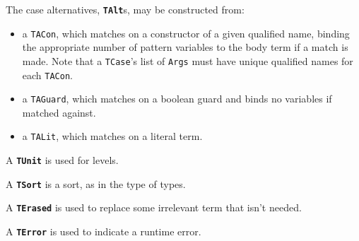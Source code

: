 The case alternatives, \textbf{\lstinline{TAlt}}s, may be constructed from:
\begin{itemize}
\item a \lstinline{TACon}, which matches on a constructor of a given qualified name, binding the appropriate number of pattern variables to the body term if a match is made. Note that a \lstinline{TCase}'s list of \lstinline{Args} must have unique qualified names for each \lstinline{TACon}.
\item a \lstinline{TAGuard}, which matches on a boolean guard and binds no variables if matched against.
\item a \lstinline{TALit}, which matches on a literal term.
\end{itemize}

A \textbf{\lstinline{TUnit}} is used for levels.

A \textbf{\lstinline{TSort}} is a sort, as in the type of types.

A \textbf{\lstinline{TErased}} is used to replace some irrelevant term that isn't needed.

A \textbf{\lstinline{TError}} is used to indicate a runtime error.

